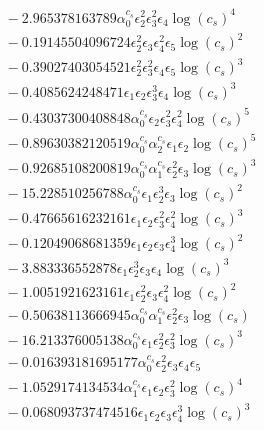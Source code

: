 \documentclass[10pt]{article}
\begin{document}
\begin{align*}
&{}  - 2.965378163789 \alpha_{0}^{c_s} \epsilon_{2}^{2} \epsilon_{3}^{2} \epsilon_{4} \log{\left(c_{s} \right)}^{4} \\
&{}  - 0.19145504096724 \epsilon_{2}^{2} \epsilon_{3} \epsilon_{4}^{2} \epsilon_{5} \log{\left(c_{s} \right)}^{2} \\
&{}  - 0.39027403054521 \epsilon_{2}^{2} \epsilon_{3}^{2} \epsilon_{4} \epsilon_{5} \log{\left(c_{s} \right)}^{3} \\
&{}  - 0.4085624248471 \epsilon_{1} \epsilon_{2} \epsilon_{3}^{3} \epsilon_{4} \log{\left(c_{s} \right)}^{3} \\
&{}  - 0.43037300408848 \alpha_{0}^{c_s} \epsilon_{2} \epsilon_{3}^{2} \epsilon_{4}^{2} \log{\left(c_{s} \right)}^{5} \\
&{}  - 0.89630382120519 \alpha_{0}^{c_s} \alpha_{2}^{c_s} \epsilon_{1} \epsilon_{2} \log{\left(c_{s} \right)}^{5} \\
&{}  - 0.92685108200819 \alpha_{0}^{c_s} \alpha_{1}^{c_s} \epsilon_{2}^{2} \epsilon_{3} \log{\left(c_{s} \right)}^{3} \\
&{}  - 15.228510256788 \alpha_{0}^{c_s} \epsilon_{1} \epsilon_{2}^{3} \epsilon_{3} \log{\left(c_{s} \right)}^{2} \\
&{}  - 0.47665616232161 \epsilon_{1} \epsilon_{2} \epsilon_{3}^{2} \epsilon_{4}^{2} \log{\left(c_{s} \right)}^{3} \\
&{}  - 0.12049068681359 \epsilon_{1} \epsilon_{2} \epsilon_{3} \epsilon_{4}^{3} \log{\left(c_{s} \right)}^{2} \\
&{}  - 3.883336552878 \epsilon_{1} \epsilon_{2}^{3} \epsilon_{3} \epsilon_{4} \log{\left(c_{s} \right)}^{3} \\
&{}  - 1.0051921623161 \epsilon_{1} \epsilon_{2}^{2} \epsilon_{3} \epsilon_{4}^{2} \log{\left(c_{s} \right)}^{2} \\
&{}  - 0.50638113666945 \alpha_{0}^{c_s} \alpha_{1}^{c_s} \epsilon_{2}^{2} \epsilon_{3} \log{\left(c_{s} \right)} \\
&{}  - 16.213376005138 \alpha_{0}^{c_s} \epsilon_{1} \epsilon_{2}^{2} \epsilon_{3}^{2} \log{\left(c_{s} \right)}^{3} \\
&{}  - 0.016393181695177 \alpha_{0}^{c_s} \epsilon_{2}^{2} \epsilon_{3} \epsilon_{4} \epsilon_{5} \\
&{}  - 1.0529174134534 \alpha_{1}^{c_s} \epsilon_{1} \epsilon_{2} \epsilon_{3}^{2} \log{\left(c_{s} \right)}^{4} \\
&{}  - 0.068093737474516 \epsilon_{1} \epsilon_{2} \epsilon_{3} \epsilon_{4}^{3} \log{\left(c_{s} \right)}^{3} \\

\end{align*}
\end{document}
